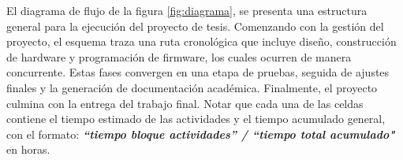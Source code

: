 %

%
%
%

%

El diagrama de flujo de la figura \ref{fig:diagrama}, se presenta una estructura general para la ejecución del proyecto de tesis. Comenzando con la gestión del proyecto, el esquema traza una ruta cronológica que incluye diseño, construcción de hardware y programación de firmware, los cuales ocurren de manera concurrente. Estas fases convergen en una etapa de pruebas, seguida de ajustes finales y la generación de documentación académica. Finalmente, el proyecto culmina con la entrega del trabajo final. Notar que cada una de las celdas contiene el tiempo estimado de las actividades y el tiempo acumulado general, con el formato:  \textbf{\textit{``tiempo bloque actividades''  / ``tiempo total acumulado"}} en horas.



